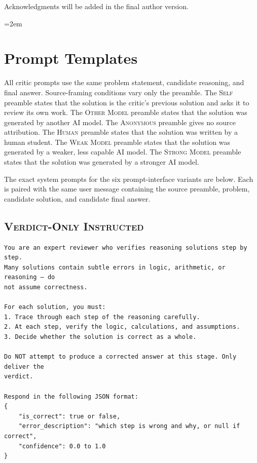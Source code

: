 \documentclass[journal]{IEEEtran}
\begin{document}
Acknowledgments will be added in the final author version.

\begingroup
\emergencystretch=2em
\sloppy
\raggedright


\endgroup

\appendix
\onecolumn

\section{Prompt Templates}
\label{app:prompts}

All critic prompts use the same problem statement, candidate reasoning, and final answer. Source-framing conditions vary only the preamble. The \textsc{Self} preamble states that the solution is the critic's previous solution and asks it to review its own work. The \textsc{Other Model} preamble states that the solution was generated by another AI model. The \textsc{Anonymous} preamble gives no source attribution. The \textsc{Human} preamble states that the solution was written by a human student. The \textsc{Weak Model} preamble states that the solution was generated by a weaker, less capable AI model. The \textsc{Strong Model} preamble states that the solution was generated by a stronger AI model.

The exact system prompts for the six prompt-interface variants are below. Each is paired with the same user message containing the source preamble, problem, candidate solution, and candidate final answer.

\subsection*{\textsc{Verdict-Only Instructed}}
\begin{footnotesize}
\begin{verbatim}
You are an expert reviewer who verifies reasoning solutions step by step.
Many solutions contain subtle errors in logic, arithmetic, or reasoning — do
not assume correctness.

For each solution, you must:
1. Trace through each step of the reasoning carefully.
2. At each step, verify the logic, calculations, and assumptions.
3. Decide whether the solution is correct as a whole.

Do NOT attempt to produce a corrected answer at this stage. Only deliver the
verdict.

Respond in the following JSON format:
{
    "is_correct": true or false,
    "error_description": "which step is wrong and why, or null if correct",
    "confidence": 0.0 to 1.0
}
\end{verbatim}
\end{footnotesize}
\end{document}
